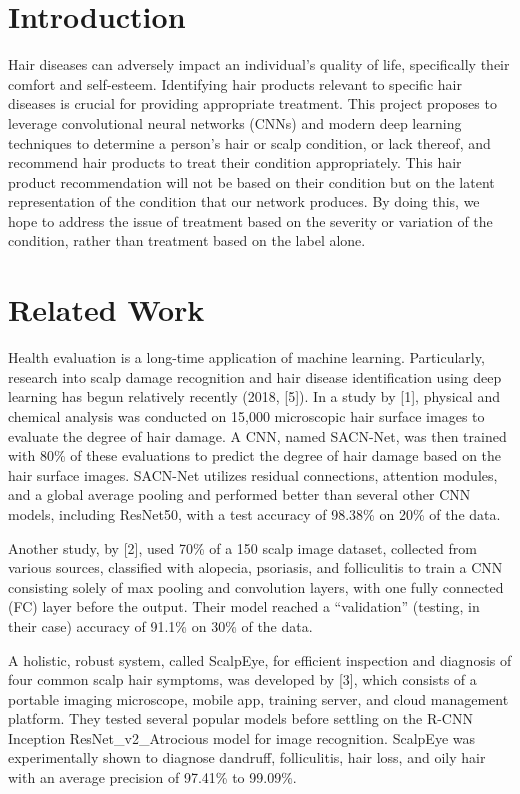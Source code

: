 \documentclass[10pt,twocolumn,letterpaper]{article}
\begin{document}
\section{Introduction}

Hair diseases can adversely impact an individual's quality of life, specifically their comfort and self-esteem. Identifying hair products relevant to specific hair diseases is crucial for providing appropriate treatment. This project proposes to leverage convolutional neural networks (CNNs) and modern deep learning techniques to determine a person's hair or scalp condition, or lack thereof, and recommend hair products to treat their condition appropriately. This hair product recommendation will not be based on their condition but on the latent representation of the condition that our network produces. By doing this, we hope to address the issue of treatment based on the severity or variation of the condition, rather than treatment based on the label alone.
\section{Related Work}
Health evaluation is a long-time application of machine learning. Particularly, research into scalp damage recognition and hair disease identification using deep learning has begun relatively recently (2018, [5]). In a study by [1], physical and chemical analysis was conducted on 15,000 microscopic hair surface images to evaluate the degree of hair damage. A CNN, named SACN-Net, was then trained with 80\% of these evaluations to predict the degree of hair damage based on the hair surface images. SACN-Net utilizes residual connections, attention modules, and a global average pooling and performed better than several other CNN models, including ResNet50, with a test accuracy of 98.38\% on 20\% of the data.

Another study, by [2], used 70\% of a 150 scalp image dataset, collected from various sources, classified with alopecia, psoriasis, and folliculitis to train a CNN consisting solely of max pooling and convolution layers, with one fully connected (FC) layer before the output. Their model reached a “validation” (testing, in their case) accuracy of 91.1\% on 30\% of the data. 

A holistic, robust system, called ScalpEye, for efficient inspection and diagnosis of four common scalp hair symptoms, was developed by [3], which consists of a portable imaging microscope, mobile app, training server, and cloud management platform. They tested several popular models before settling on the R-CNN Inception ResNet\_v2\_Atrocious model for image recognition. ScalpEye was experimentally shown to diagnose dandruff, folliculitis, hair loss, and oily hair with an average precision of 97.41\% to 99.09\%.
\end{document}
